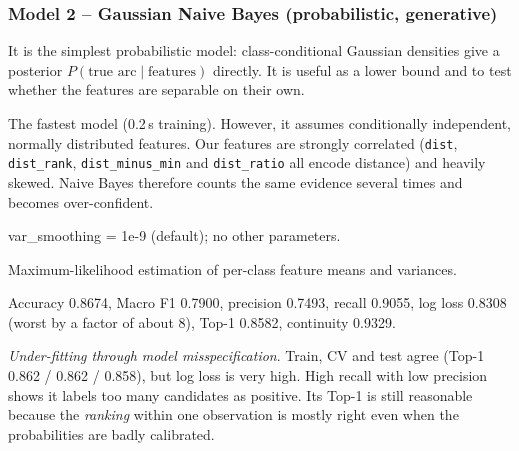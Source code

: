 \documentclass[10pt,a4paper]{article}
\newcommand{\code}[1]{\texttt{\small #1}}
\newenvironment{qa}{\begin{description}[leftmargin=0pt,labelsep=0.4em,itemsep=2pt,font=\bfseries\color{accent!80!black}]}{\end{description}}
\begin{document}
\subsubsection*{Model 2 -- Gaussian Naive Bayes (probabilistic, generative)}
\begin{qa}
\item[A1. Why suitable?] It is the simplest probabilistic model: class-conditional Gaussian densities give a posterior $P(\text{true arc}\mid\text{features})$ directly. It is useful as a lower bound and to test whether the features are separable on their own.
\item[A2. Strengths / limitations.] The fastest model (0.2\,s training). However, it assumes conditionally independent, normally distributed features. Our features are strongly correlated (\code{dist}, \code{dist\_rank}, \code{dist\_minus\_min} and \code{dist\_ratio} all encode distance) and heavily skewed. Naive Bayes therefore counts the same evidence several times and becomes over-confident.
\item[B5. Hyperparameters.] var\_smoothing = 1e-9 (default); no other parameters.
\item[B6. Objective.] Maximum-likelihood estimation of per-class feature means and variances.
\item[C7/C8. Student-test.] Accuracy 0.8674, Macro F1 0.7900, precision 0.7493, recall 0.9055, log loss 0.8308 (worst by a factor of about 8), Top-1 0.8582, continuity 0.9329.
\item[C9. Fit.] \emph{Under-fitting through model misspecification}. Train, CV and test agree (Top-1 0.862 / 0.862 / 0.858), but log loss is very high. High recall with low precision shows it labels too many candidates as positive. Its Top-1 is still reasonable because the \emph{ranking} within one observation is mostly right even when the probabilities are badly calibrated.
\end{qa}
\end{document}

